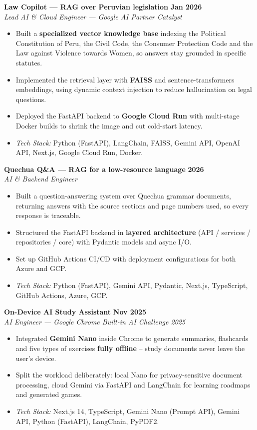 \documentclass[11pt,letterpaper]{article}
\newcommand{\cventry}[4]{%
  \textbf{#1} \hfill \textbf{#2}\\
  \textit{#3} \hfill \textit{#4}\par\nobreak\vspace{1pt}%
}
\begin{document}
\cventry{Law Copilot --- RAG over Peruvian legislation}{Jan 2026}{Lead AI \& Cloud Engineer --- Google AI Partner Catalyst}{}
\begin{itemize}
  \item Built a \textbf{specialized vector knowledge base} indexing the Political Constitution of Peru, the Civil Code, the Consumer Protection Code and the Law against Violence towards Women, so answers stay grounded in specific statutes.
  \item Implemented the retrieval layer with \textbf{FAISS} and sentence-transformers embeddings, using dynamic context injection to reduce hallucination on legal questions.
  \item Deployed the FastAPI backend to \textbf{Google Cloud Run} with multi-stage Docker builds to shrink the image and cut cold-start latency.
  \item \textit{Tech Stack:} Python (FastAPI), LangChain, FAISS, Gemini API, OpenAI API, Next.js, Google Cloud Run, Docker.
\end{itemize}

\cventry{Quechua Q\&A --- RAG for a low-resource language}{2026}{AI \& Backend Engineer}{}
\begin{itemize}
  \item Built a question-answering system over Quechua grammar documents, returning answers with the source sections and page numbers used, so every response is traceable.
  \item Structured the FastAPI backend in \textbf{layered architecture} (API / services / repositories / core) with Pydantic models and async I/O.
  \item Set up GitHub Actions CI/CD with deployment configurations for both Azure and GCP.
  \item \textit{Tech Stack:} Python (FastAPI), Gemini API, Pydantic, Next.js, TypeScript, GitHub Actions, Azure, GCP.
\end{itemize}

\cventry{On-Device AI Study Assistant}{Nov 2025}{AI Engineer --- Google Chrome Built-in AI Challenge 2025}{}
\begin{itemize}
  \item Integrated \textbf{Gemini Nano} inside Chrome to generate summaries, flashcards and five types of exercises \textbf{fully offline} -- study documents never leave the user's device.
  \item Split the workload deliberately: local Nano for privacy-sensitive document processing, cloud Gemini via FastAPI and LangChain for learning roadmaps and generated games.
  \item \textit{Tech Stack:} Next.js 14, TypeScript, Gemini Nano (Prompt API), Gemini API, Python (FastAPI), LangChain, PyPDF2.
\end{itemize}
\end{document}
